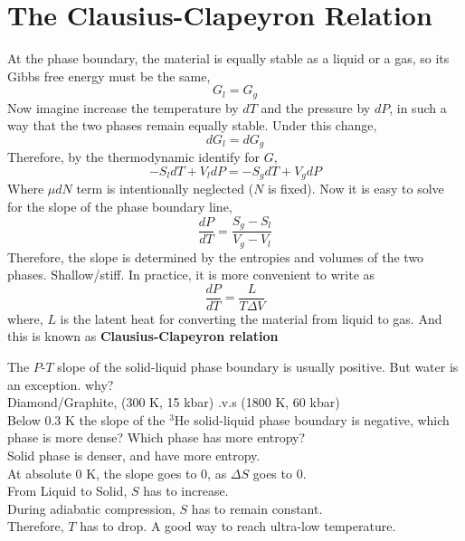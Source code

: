 \section{The Clausius-Clapeyron Relation}
At the phase boundary, the material is equally stable as a liquid or a gas, so its Gibbs free energy must be the same,
\begin{equation} G_l = G_g \end{equation}
Now imagine increase the temperature by $dT$ and the pressure by $dP$, in such a way that the two phases remain equally stable.
Under this change,
\begin{equation} dG_l = dG_g \end{equation}
Therefore, by the thermodynamic identify for $G$,
\begin{equation} -S_ldT + V_ldP = -S_gdT + V_gdP \end{equation}
Where $\mu dN$ term is intentionally neglected ($N$ is fixed). 
Now it is easy to solve for the slope of the phase boundary line,
\begin{equation} \frac{dP}{dT} = \frac{S_g-S_l}{V_g-V_l} \end{equation}
Therefore, the slope is determined by the entropies and volumes of the two phases.
Shallow/stiff.
In practice, it is more convenient to write as
\begin{equation} \frac{dP}{dT} = \frac{L}{T\Delta{V}} \end{equation}
where, $L$ is the latent heat for converting the material from liquid to gas. And this is known as {\bf Clausius-Clapeyron relation}

The $P$-$T$ slope of the solid-liquid phase boundary is usually positive. But water is an exception. why?\\
Diamond/Graphite, (300 K, 15 kbar) .v.s (1800 K, 60 kbar)\\

Below 0.3 K the slope of the $^3$He solid-liquid phase boundary is negative, which phase is more dense? Which phase has more entropy?\\
Solid phase is denser, and have more entropy.\\
At absolute 0 K, the slope goes to 0, as $\Delta{S}$ goes to 0.\\
From Liquid to Solid, $S$ has to increase.\\
During adiabatic compression, $S$ has to remain constant.\\
Therefore, $T$ has to drop. A good way to reach ultra-low temperature.


